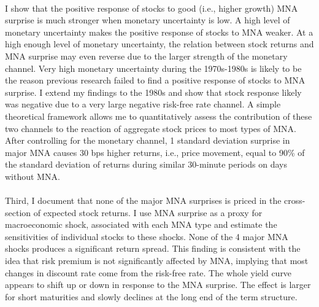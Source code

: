 \documentclass[12pt]{article}
\begin{document}
\paragraph{}
I show that the positive response of stocks to good (i.e., higher growth) MNA surprise is much stronger when monetary uncertainty is low. A high level of monetary uncertainty makes the positive response of stocks to MNA weaker. At a high enough level of monetary uncertainty, the relation between stock returns and MNA surprise may even reverse due to the larger strength of the monetary channel. Very high monetary uncertainty during the 1970s-1980s is likely to be the reason previous research failed to find a positive response of stocks to MNA surprise. I extend my findings to the 1980s and show that stock response likely was negative due to a very large negative risk-free rate channel. A simple theoretical framework allows me to quantitatively assess the contribution of these two channels to the reaction of aggregate stock prices to most types of MNA. After controlling for the monetary channel, 1 standard deviation surprise in major MNA causes 30 bps higher returns, i.e., price movement, equal to 90\% of the standard deviation of returns during similar 30-minute periods on days without MNA. 
\paragraph{}
Third, I document that none of the major MNA surprises is priced in the cross-section of expected stock returns. I use MNA surprise as a proxy for macroeconomic shock, associated with each MNA type and estimate the sensitivities of individual stocks to these shocks. None of the 4 major MNA shocks produces a significant return spread. This finding is consistent with the idea that risk premium is not significantly affected by MNA, implying that most changes in discount rate come from the risk-free rate. The whole yield curve appears to shift up or down in response to the MNA surprise. The effect is larger for short maturities and slowly declines at the long end of the term structure.
\end{document}
